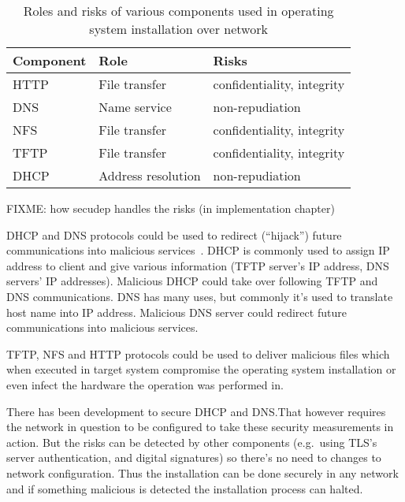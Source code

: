 \begin{table}[!ht]
  \def\arraystretch{1.1}%
  \begin{center}
    \begin{tabular}{| l | l | l |}
      \hline
      Component   & Role               & Risks                      \\
      \hline
      HTTP        & File transfer      & confidentiality, integrity \\
      DNS         & Name service       & non-repudiation            \\
      NFS         & File transfer      & confidentiality, integrity \\
      TFTP        & File transfer      & confidentiality, integrity \\
      DHCP        & Address resolution & non-repudiation            \\
      \hline
    \end{tabular}
    \caption{Roles and risks of various components used in operating
      system installation over network\label{tab:risks_table}}
  \end{center}
\end{table}

FIXME: how secudep handles the risks (in implementation chapter)

DHCP and DNS protocols could be used to redirect (``hijack'') future
communications into malicious
services~\cite{green2005dns}\cite{ornaghi2003man}. DHCP is commonly
used to assign IP address to client and give various information (TFTP
server's IP address, DNS servers' IP addresses). Malicious DHCP could
take over following TFTP and DNS communications. DNS has many uses,
but commonly it's used to translate host name into IP
address. Malicious DNS server could redirect future communications
into malicious services.

TFTP, NFS and HTTP protocols could be used to deliver malicious files
which when executed in target system compromise the operating system
installation or even infect the hardware the operation was performed
in.

There has been development to secure DHCP and DNS.\@ That however
requires the network in question to be configured to take these
security measurements in action. But the risks can be detected by
other components (e.g.\ using TLS's server authentication, and digital
signatures) so there's no need to changes to network
configuration. Thus the installation can be done securely in any
network and if something malicious is detected the installation
process can halted.

